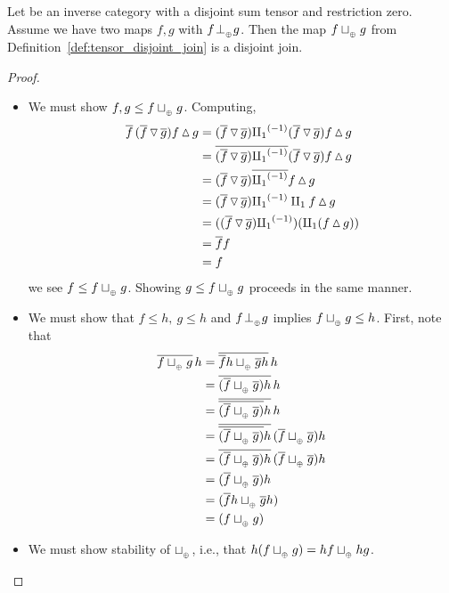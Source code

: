 \begin{proposition}\label{prop:disjointness_tensor_gives_disjoint_join}
  Let \X be an inverse category with a disjoint sum tensor and restriction zero. Assume we have two
  maps $f,g$ with $f\tperp g$. Then the map $f \tjoin g$ from
  Definition~\ref{def:tensor_disjoint_join} is a disjoint join.
\end{proposition}
\begin{proof}
  \begin{itemize}
    \item [\axiom{DJ}{1}] We must show $f, g \le f \tjoin g$. Computing,
      \begin{align*}
        \rst{f}\,(\rst{f}\tjdown\rst{g})  f\tjup g
          &= (\rst{f}\tjdown\rst{g}) \icpa (\rst{f}\tjdown\rst{g} ) f\tjup g \\
        &=\rst{(\rst{f}\tjdown\rst{g}) \icpa} (\rst{f}\tjdown\rst{g}) f\tjup g  \\
        &=(\rst{f}\tjdown\rst{g}) \rst{\icpa} f\tjup g  \\
        &=(\rst{f}\tjdown\rst{g}) \icpa \cpa f\tjup g \\
        &=((\rst{f}\tjdown\rst{g}) \icpa) (\cpa (f \tjup g)) \\
        &= \rst{f} f \\
        &=f
      \end{align*}
      we see $f \le f \tjoin g$. Showing $g \le f \tjoin g$ proceeds in the same manner.
    \item [\axiom{DJ}{2}] We must show that $f \le h,\ g\le h$ and $f\tperp g$ implies
      $f \tjoin g \le h$. First, note that
      \begin{align*}
        \rst{f \tjoin g} \,h & = \rst{\rst{f} h \tjoin \rst{g} h} \,h\\
        & = \rst{(\rst{f} \tjoin \rst{g})h} \,h\\
        & = \rst{\rst{(\rst{f} \tjoin \rst{g})}h} \,h\\
        & = \rst{\rst{(\rst{f} \tjoin \rst{g})}h}\,(\rst{f} \tjoin \rst{g})h\\
        & = \rst{(\rst{f} \tjoin \rst{g})h}\,(\rst{f} \tjoin \rst{g})h\\
        & = (\rst{f}\tjoin \rst{g})h\\
        & = (\rst{f}h\tjoin \rst{g}h)\\
        & = (f\tjoin g)
      \end{align*}
    \item [\axiom{DJ}{3}] We must show stability of $\tjoin$, i.e., that
      $h(f\tjoin g) = h f \tjoin h g$.


\end{itemize}
\end{proof}
